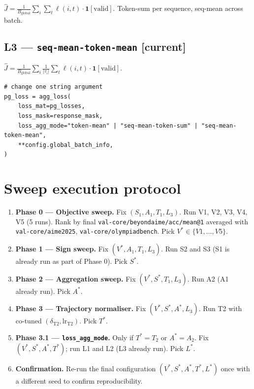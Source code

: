 \documentclass[11pt]{article}
\begin{document}
$\hat J = \tfrac{1}{B_{\text{global}}}\sum_i\sum_t\ell(i,t)\cdot\mathbf 1[\text{valid}]$.
Token-sum per sequence, seq-mean across batch.

\subsection{L3 --- \texttt{seq-mean-token-mean} [current]}

$\hat J = \tfrac{1}{B_{\text{global}}}\sum_i \tfrac{1}{|\tau_i|}\sum_t\ell(i,t)\cdot\mathbf 1[\text{valid}]$.

\begin{lstlisting}
# change one string argument
pg_loss = agg_loss(
    loss_mat=pg_losses,
    loss_mask=response_mask,
    loss_agg_mode="token-mean" | "seq-mean-token-sum" | "seq-mean-token-mean",
    **config.global_batch_info,
)
\end{lstlisting}

\section{Sweep execution protocol}
\label{sec:protocol}

\begin{enumerate}
\item \textbf{Phase 0 --- Objective sweep.} Fix $(S_1, A_1, T_1, L_3)$.
Run V1, V2, V3, V4, V5 (5 runs). Rank by final
\verb|val-core/beyondaime/acc/mean@1| averaged with
\verb|val-core/aime2025|, \verb|val-core/olympiadbench|. Pick
$V^\ast \in \{V1,\ldots,V5\}$.
\item \textbf{Phase 1 --- Sign sweep.} Fix $(V^\ast, A_1, T_1, L_3)$.
Run S2 and S3 (S1 is already run as part of Phase 0). Pick $S^\ast$.
\item \textbf{Phase 2 --- Aggregation sweep.} Fix $(V^\ast, S^\ast, T_1, L_3)$.
Run A2 (A1 already run). Pick $A^\ast$.
\item \textbf{Phase 3 --- Trajectory normaliser.} Fix
$(V^\ast, S^\ast, A^\ast, L_3)$. Run T2 with co-tuned
$(\delta_{\text{T2}}, \text{lr}_{\text{T2}})$. Pick $T^\ast$.
\item \textbf{Phase 3.1 --- \texttt{loss\_agg\_mode}.} Only if
$T^\ast = T_2$ or $A^\ast = A_2$. Fix $(V^\ast, S^\ast, A^\ast, T^\ast)$;
run L1 and L2 (L3 already run). Pick $L^\ast$.
\item \textbf{Confirmation.} Re-run the final configuration
$(V^\ast, S^\ast, A^\ast, T^\ast, L^\ast)$ once with a different seed to
confirm reproducibility.
\end{enumerate}
\end{document}
